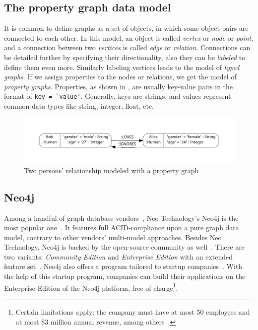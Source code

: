 \subsection{The property graph data model}

It is common to define graphs as a set of objects, in which some object pairs are connected to each other. In this model, an object is called \emph{vertex} or \emph{node} or \emph{point}, and a connection between two \emph{vertices} is called \emph{edge} or \emph{relation}. Connections can be detailed further by specifying their directionality, also they can be \emph{labeled} to define them even more. Similarly labeling vertices leads to the model of \emph{typed graphs}. If we assign properties to the nodes or relations, we get the model of \emph{property graphs}. Properties, as shown in , are usually key-value pairs in the format of \lstinline{key = `value'}. Generally, keys are strings, and values represent common data types like string, integer, float, etc.

\begin{figure}[!htb]
    \centering
    \includegraphics[width=\textwidth, trim=12mm 12mm 12mm 12mm,clip]{figures/property-graph.pdf}
    \caption{Two persons' relationship modeled with a property graph}
    \label{fig:property-graph}
\end{figure}

\subsection{Neo4j}
\label{subsection:preliminaryneo4j}

Among a handful of graph database vendors~\cite{graph-dbs}, Neo Technology's Neo4j is the most popular one~\cite{graph-dbs-raking}. It features full ACID-compliance upon a pure graph data model, contrary to other vendors' multi-model approaches. Besides Neo Technology, Neo4j is backed by the open-source community as well~\cite{neo4j-github}. There are two variants: \emph{Community Edition} and \emph{Enterprise Edition} with an extended feature set~\cite{neo4j-licensing}. Neo4j also offers a program tailored to startup companies~\cite{neo4j-startup-program}. With the help of this startup program, companies can build their applications on the Enterprise Edition of the Neo4j platform, free of charge\footnote{Certain limitations apply: the company must have at most 50 employees and at most \$3 million annual revenue, among others~\cite{neo4j-startup-program}.}.

